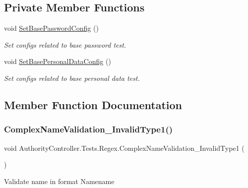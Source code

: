 \subsection*{Private Member Functions}
\begin{DoxyCompactItemize}
\item 
void \mbox{\hyperlink{class_authority_controller_1_1_tests_1_1_regex_a7ca12992eb32b151d7032331f9294807}{Set\+Base\+Password\+Config}} ()
\begin{DoxyCompactList}\small\item\em Set configs related to base password test. \end{DoxyCompactList}\item 
void \mbox{\hyperlink{class_authority_controller_1_1_tests_1_1_regex_a1e29b97de1195b0683853c3ef03c6ff9}{Set\+Base\+Personal\+Data\+Config}} ()
\begin{DoxyCompactList}\small\item\em Set configs related to base personal data test. \end{DoxyCompactList}\end{DoxyCompactItemize}


\subsection{Member Function Documentation}
\mbox{\label{class_authority_controller_1_1_tests_1_1_regex_a879692bffbbf9c13c7c6f400d6b38707}} 
\subsubsection{\texorpdfstring{Complex\+Name\+Validation\+\_\+\+Invalid\+Type1()}{ComplexNameValidation\_InvalidType1()}}
{\footnotesize\ttfamily void Authority\+Controller.\+Tests.\+Regex.\+Complex\+Name\+Validation\+\_\+\+Invalid\+Type1 (\begin{DoxyParamCaption}{ }\end{DoxyParamCaption})}



Validate name in format Name\textquotesingle{}name 

